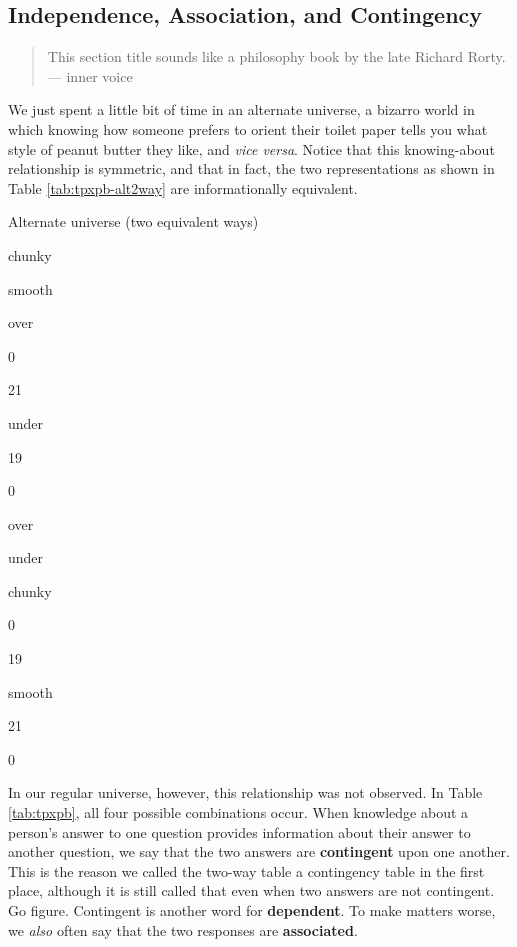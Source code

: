 \documentclass[]{book}
\begin{document}
\hypertarget{sec:indep}{%
\subsection{Independence, Association, and Contingency}\label{sec:indep}}

\begin{quote}
This section title sounds like a philosophy book by the late Richard Rorty.
--- inner voice
\end{quote}

We just spent a little bit of time in an alternate universe, a bizarro world in which knowing how someone prefers to orient their toilet paper tells you what style of peanut butter they like, and \emph{vice versa}. Notice that this knowing-about relationship is symmetric, and that in fact, the two representations as shown in Table \ref{tab:tpxpb-alt2way} are informationally equivalent.

\label{tab:tpxpb-alt2way}Alternate universe (two equivalent ways)

chunky

smooth

over

0

21

under

19

0

over

under

chunky

0

19

smooth

21

0

In our regular universe, however, this relationship was not observed. In Table \ref{tab:tpxpb}, all four possible combinations occur. When knowledge about a person's answer to one question provides information about their answer to another question, we say that the two answers are \textbf{contingent} upon one another. This is the reason we called the two-way table a contingency table in the first place, although it is still called that even when two answers are not contingent. Go figure. Contingent is another word for \textbf{dependent}. To make matters worse, we \emph{also} often say that the two responses are \textbf{associated}.
\end{document}
